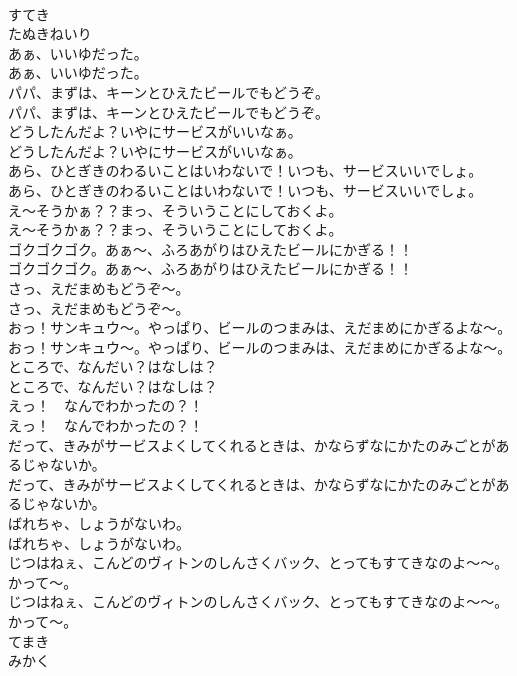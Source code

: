 \documentclass[8pt]{extreport}
\begin{document}
\begin{CJK}{UTF8}{min}
\\	すてき
\\	たぬきねいり
\\	あぁ、いいゆだった。	
\\	あぁ、いいゆだった。 
\\	パパ、まずは、キーンとひえたビールでもどうぞ。	
\\	パパ、まずは、キーンとひえたビールでもどうぞ。 
\\	どうしたんだよ？いやにサービスがいいなぁ。	
\\	どうしたんだよ？いやにサービスがいいなぁ。 
\\	あら、ひとぎきのわるいことはいわないで！いつも、サービスいいでしょ。	
\\	あら、ひとぎきのわるいことはいわないで！いつも、サービスいいでしょ。 
\\	え～そうかぁ？？まっ、そういうことにしておくよ。	
\\	え～そうかぁ？？まっ、そういうことにしておくよ。 
\\	ゴクゴクゴク。あぁ～、ふろあがりはひえたビールにかぎる！！	
\\	ゴクゴクゴク。あぁ～、ふろあがりはひえたビールにかぎる！！ 
\\	さっ、えだまめもどうぞ～。	
\\	さっ、えだまめもどうぞ～。 
\\	おっ！サンキュウ～。やっぱり、ビールのつまみは、えだまめにかぎるよな～。	
\\	おっ！サンキュウ～。やっぱり、ビールのつまみは、えだまめにかぎるよな～。 
\\	ところで、なんだい？はなしは？	
\\	ところで、なんだい？はなしは？ 
\\	えっ！　なんでわかったの？！	
\\	えっ！　なんでわかったの？！ 
\\	だって、きみがサービスよくしてくれるときは、かならずなにかたのみごとがあるじゃないか。	
\\	だって、きみがサービスよくしてくれるときは、かならずなにかたのみごとがあるじゃないか。 
\\	ばれちゃ、しょうがないわ。	
\\	ばれちゃ、しょうがないわ。 
\\	じつはねぇ、こんどのヴィトンのしんさくバック、とってもすてきなのよ～～。かって～。	
\\	じつはねぇ、こんどのヴィトンのしんさくバック、とってもすてきなのよ～～。かって～。 
\\	てまき
\\	みかく

\end{CJK}
\end{document}
